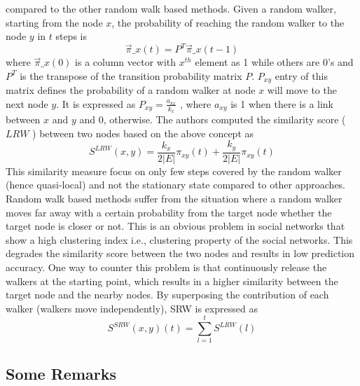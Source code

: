 \begin{itemize}
          compared to the other random walk based methods. Given a random walker,
          starting from the node \(x\), the probability of reaching the random
          walker to the node \(y\) in \(t\) steps is
          \[\overrightarrow{\pi}\_x(t) = P^T \overrightarrow{\pi}\_x(t-1)\] where
          \(\overrightarrow{\pi}\_x(0)\) is a column vector with \(x^{th}\)
          element as 1 while others are 0's and \(P^T\) is the transpose of the
          transition probability matrix \(P\). \(P_{xy}\) entry of this matrix
          defines the probability of a random walker at node \(x\) will move to
          the next node \(y\). It is expressed as \(P_{xy} = \frac{a_{kx}}{k_x}\)
          , where \(a_{xy}\) is 1 when there is a link between \(x\) and \(y\) and
          0, otherwise. The authors computed the similarity score ( \(LRW\) )
          between two nodes based on the above concept as
          \[S^{LRW}(x, y) = \frac{k_x}{2|E|}\pi_{xy}(t) + \frac{k_y}{2|E|}\pi_{xy}(t)\]
          This similarity measure focus on only few steps covered by the random
          walker (hence quasi-local) and not the stationary state compared to
          other approaches. Random walk based methods suffer from the situation
          where a random walker moves far away with a certain probability from the
          target node whether the target node is closer or not. This is an obvious
          problem in social networks that show a high clustering index i.e.,
          clustering property of the social networks. This degrades the similarity
          score between the two nodes and results in low prediction accuracy. One
          way to counter this problem is that continuously release the walkers at
          the starting point, which results in a higher similarity between the
          target node and the nearby nodes. By superposing the contribution of
          each walker (walkers move independently), SRW is expressed as
          \[S^{SRW} (x, y) (t) = \sum_{l=1}^{t} S^{LRW} (l)\]
\end{itemize}

\subsection{Some Remarks}


